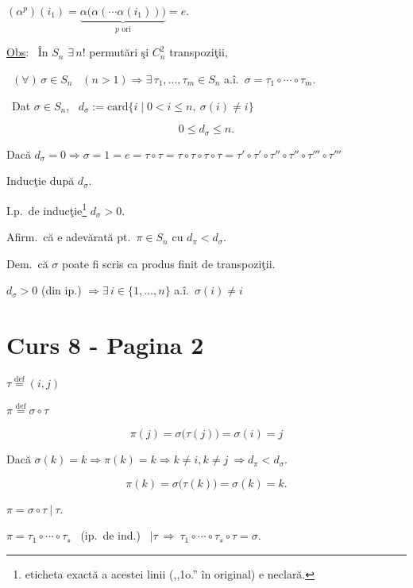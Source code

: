 \bigskip
\noindent $(\alpha^p)(i_1) = \underbrace{\alpha\big(\alpha(\cdots\alpha(i_1))\big)}_{p \text{ ori}} = e.$

\bigskip
\noindent\underline{Obs}: \ În $S_n$ $\exists\,n!$ permutări şi $C_n^2$ transpoziţii,

\bigskip
\noindent{} \ $(\forall)\,\sigma\in S_n$ \ $(n>1) \Rightarrow \exists\,\tau_1,\ldots,\tau_m\in S_n$ a.î.\ $\sigma=\tau_1\circ\cdots\circ\tau_m$.

\bigskip
\noindent{} \ Dat $\sigma\in S_n$, \ $d_\sigma := \text{card}\{i \mid 0<i\leq n,\ \sigma(i)\neq i\}$

\[
0\leq d_\sigma\leq n.
\]

\bigskip
\noindent Dacă $d_\sigma=0 \Rightarrow \sigma=1=e=\tau\circ\tau=\tau\circ\tau\circ\tau\circ\tau=\tau'\circ\tau'\circ\tau''\circ\tau''\circ\tau'''\circ\tau'''$

\bigskip
\noindent Inducţie după $d_\sigma$.

\noindent I.p.\ de inducţie\footnote{eticheta exactă a acestei linii (,,1o.'' în original) e neclară.} $d_\sigma>0$.

\bigskip
\noindent Afirm.\ că e adevărată pt.\ $\pi\in S_n$ cu $d_\pi<d_\sigma$.

\noindent Dem.\ că $\sigma$ poate fi scris ca produs finit de transpoziţii.

\noindent $d_\sigma>0$ (din ip.) $\Rightarrow \exists\,i\in\{1,\ldots,n\}$ a.î.\ $\sigma(i)\neq i$




\section*{Curs 8 - Pagina 2}

\noindent $\tau \overset{\text{def}}{=} (i,j)$

\noindent $\pi \overset{\text{def}}{=} \sigma\circ\tau$

\[
\pi(j) = \sigma\big(\tau(j)\big) = \sigma(i) = j
\]

\bigskip
\noindent Dacă $\sigma(k)=k \Rightarrow \pi(k)=k \Rightarrow k\neq i, k\neq j \ \Rightarrow d_\pi<d_\sigma.$

\[
\pi(k) = \sigma\big(\tau(k)\big) = \sigma(k) = k.
\]

\noindent $\pi = \sigma\circ\tau \ \big| \ \tau.$

\bigskip
\noindent $\pi = \tau_1\circ\cdots\circ\tau_s$ \ (ip.\ de ind.) \ $\big|\tau \ \Rightarrow \ \tau_1\circ\cdots\circ\tau_s\circ\tau=\sigma.$

